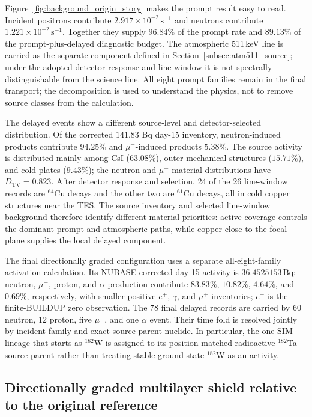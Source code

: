 \documentclass[11pt]{article}
\newcommand{\cps}{\ensuremath{\,\mathrm{s^{-1}}}}
\begin{document}
Figure~\ref{fig:background_origin_story} makes the prompt result easy to read.
Incident positrons contribute $2.917\times10^{-2}\cps$ and neutrons contribute
$1.221\times10^{-2}\cps$. Together they supply $96.84\%$ of the prompt rate
and $89.13\%$ of the prompt-plus-delayed diagnostic budget. The atmospheric
511\,keV line is carried as the separate component defined in
Section~\ref{subsec:atm511_source}; under the adopted detector response and line
window it is not spectrally distinguishable from the science line.
All eight prompt families remain in the final transport; the decomposition is used
to understand the physics, not to remove source classes from the calculation.

The delayed events show a different source-level and detector-selected
distribution. Of the corrected $141.83$ Bq day-15 inventory, neutron-induced
products contribute $94.25\%$ and $\mu^-$-induced products $5.38\%$. The source
activity is distributed mainly among CsI ($63.08\%$), outer mechanical
structures ($15.71\%$), and cold plates ($9.43\%$); the neutron and $\mu^-$
material distributions have $D_{\mathrm{TV}}=0.823$. After detector response and
selection, 24 of the 26 line-window records are $^{64}$Cu decays and the other
two are $^{61}$Cu decays, all in cold copper structures near the TES. The
source inventory and selected line-window background therefore identify
different material priorities: active coverage controls the dominant prompt and
atmospheric paths, while copper close to the focal plane supplies the local
delayed component.

The final directionally graded configuration uses a separate all-eight-family
activation calculation.
Its NUBASE-corrected day-15 activity is $36.4525153\,\mathrm{Bq}$: neutron,
$\mu^-$, proton, and $\alpha$ production contribute $83.83\%$, $10.82\%$,
$4.64\%$, and $0.69\%$, respectively, with smaller positive $e^+$, $\gamma$,
and $\mu^+$ inventories; $e^-$ is the finite-BUILDUP zero observation. The 78
final delayed records are carried by 60 neutron, 12 proton, five $\mu^-$, and one
$\alpha$ event. Their time fold is resolved jointly by incident family and
exact-source parent nuclide. In particular, the one SIM lineage that starts as
$^{182}$W is assigned to its position-matched radioactive $^{182}$Ta source
parent rather than treating stable ground-state $^{182}$W as an activity.

\FloatBarrier

\subsection{Directionally graded multilayer shield relative to the original reference}
\label{subsec:optimized_shield_results}
\end{document}
